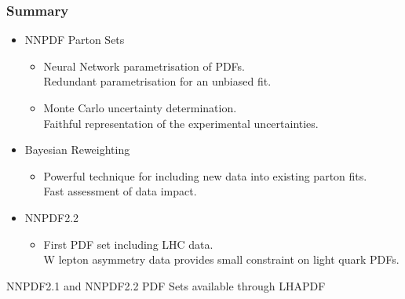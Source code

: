 \documentclass[10pt]{beamer}
\newcommand{\vso}{\vskip15pt}
\begin{document}
\begin{frame}
\frametitle{Summary}
\begin{itemize}
\item<1-> NNPDF Parton Sets
\begin{itemize}
		\item<1-> Neural Network parametrisation of PDFs. \\
		{ \color{blue} Redundant parametrisation for an unbiased fit.}
		\item<1-> Monte Carlo uncertainty determination.\\
		{ \color{blue}Faithful representation of the experimental uncertainties.}\vso
		\end{itemize}
\item<1-> Bayesian Reweighting
\begin{itemize}
		\item<1-> Powerful technique for including new data into existing parton fits. \\
		{ \color{blue} Fast assessment of data impact.}\vso
		\end{itemize}
\item<1-> NNPDF2.2
\begin{itemize}
		\item<1-> First PDF set including LHC data. \\
		{ \color{blue} W lepton asymmetry data provides small constraint on light quark PDFs.}\vso
		\end{itemize}
\end{itemize}
\centerline{NNPDF2.1 and NNPDF2.2 PDF Sets available through LHAPDF}


\end{frame}
%
%
%
%
\end{document}
